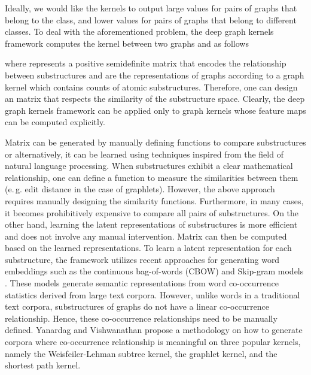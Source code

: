 \documentclass[twoside,11pt]{article}
\newcommand{\eg}{e.\,g. }
\begin{document}
Ideally, we would like the kernels to output large values for pairs of graphs that belong to the class, and lower values for pairs of graphs that belong to different classes.
To deal with the aforementioned problem, the deep graph kernels framework computes the kernel between two graphs  and  as follows

where  represents a positive semidefinite matrix that encodes the relationship between substructures and  are the representations of graphs  according to a graph kernel which contains counts of atomic substructures.
Therefore, one can design an  matrix that respects the similarity of the substructure space.
Clearly, the deep graph kernels framework can be applied only to graph kernels whose feature maps  can be computed explicitly.

Matrix  can be generated by manually defining functions to compare substructures or alternatively, it can be learned using techniques inspired from the field of natural language processing.
When substructures exhibit a clear mathematical relationship, one can define a function to measure the similarities between them (\eg edit distance in the case of graphlets).
However, the above approach requires manually designing the similarity functions.
Furthermore, in many cases, it becomes prohibitively expensive to compare all pairs of substructures.
On the other hand, learning the latent representations of substructures is more efficient and does not involve any manual intervention.
Matrix  can then be computed based on the learned representations.
To learn a latent representation for each substructure, the framework utilizes recent approaches for generating word embeddings such as the continuous bag-of-words (CBOW) and Skip-gram models \cite{mikolov2013distributed}.
These models generate semantic representations from word co-occurrence statistics derived from large text corpora.
However, unlike words in a traditional text corpora, substructures of graphs do not have a linear co-occurrence relationship.
Hence, these co-occurrence relationships need to be manually defined. 
Yanardag and Vishwanathan \citeyear{yanardag2015deep} propose a methodology on how to generate corpora where co-occurrence relationship is meaningful on three popular kernels, namely the Weisfeiler-Lehman subtree kernel, the graphlet kernel, and the shortest path kernel.
\end{document}
